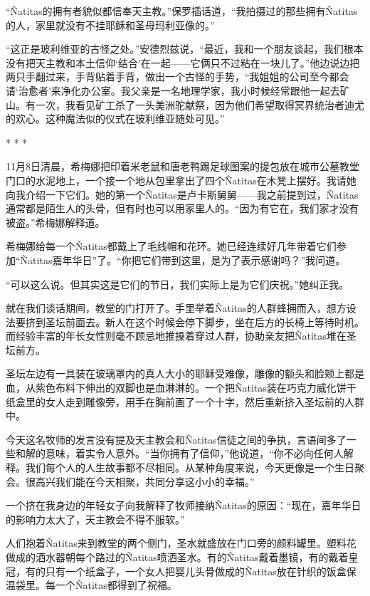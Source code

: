 \documentclass[12pt,oneside]{book}
\begin{document}
“Ñatitas的拥有者貌似都信奉天主教。”保罗插话道，“我拍摄过的那些拥有Ñatitas的人，家里就没有不挂耶稣和圣母玛利亚像的。”

“这正是玻利维亚的古怪之处。”安德烈兹说，“最近，我和一个朋友谈起，我们根本没有把天主教和本土信仰‘结合’在一起——它俩只不过粘在一块儿了。”他边说边把两只手翻过来，手背贴着手背，做出一个古怪的手势，“我姐姐的公司至今都会请‘治愈者’来净化办公室。我父亲是一名地理学家，我小时候经常跟他一起去矿山。有一次，我看见矿工杀了一头美洲驼献祭，因为他们希望取得冥界统治者迪尤的欢心。这种魔法似的仪式在玻利维亚随处可见。”

\begin{center}
* * *
\end{center}

11月8日清晨，希梅娜把印着米老鼠和唐老鸭踢足球图案的提包放在城市公墓教堂门口的水泥地上，一个接一个地从包里拿出了四个Ñatitas在木凳上摆好。我请她向我介绍一下它们。她的第一个Ñatitas是卢卡斯舅舅——我之前提到过，Ñatitas通常都是陌生人的头骨，但有时也可以用家里人的。“因为有它在，我们家才没有被盗。”希梅娜解释道。

希梅娜给每一个Ñatitas都戴上了毛线帽和花环。她已经连续好几年带着它们参加“Ñatitas嘉年华日”了。“你把它们带到这里，是为了表示感谢吗？”我问道。

“可以这么说。但其实这是它们的节日，我们实际上是为它们庆祝。”她纠正我。

就在我们谈话期间，教堂的门打开了。手里举着Ñatitas的人群蜂拥而入，想方设法要挤到圣坛前面去。新人在这个时候会停下脚步，坐在后方的长椅上等待时机。而经验丰富的年长女性则毫不顾忌地推搡着穿过人群，协助亲友把Ñatitas堆在圣坛前方。

圣坛左边有一具装在玻璃罩内的真人大小的耶稣受难像，雕像的额头和脸颊上都是血，从紫色布料下伸出的双脚也是血淋淋的。一个把Ñatitas装在巧克力威化饼干纸盒里的女人走到雕像旁，用手在胸前画了一个十字，然后重新挤入圣坛前的人群中。

今天这名牧师的发言没有提及天主教会和Ñatitas信徒之间的争执，言语间多了一些和解的意味，着实令人意外。“当你拥有了信仰，”他说道，“你不必向任何人解释。我们每个人的人生故事都不尽相同。从某种角度来说，今天更像是一个生日聚会。很高兴我们能在今天相聚，共同分享这小小的幸福。”

一个挤在我身边的年轻女子向我解释了牧师接纳Ñatitas的原因：“现在，嘉年华日的影响力太大了，天主教会不得不服软。”

人们抱着Ñatitas来到教堂的两个侧门，圣水就盛放在门口旁的颜料罐里。塑料花做成的洒水器朝每个路过的Ñatitas喷洒圣水。有的Ñatitas戴着墨镜，有的戴着皇冠，有的只有一个纸盒子，一个女人把婴儿头骨做成的Ñatitas放在针织的饭盒保温袋里。每一个Ñatitas都得到了祝福。
\end{document}
